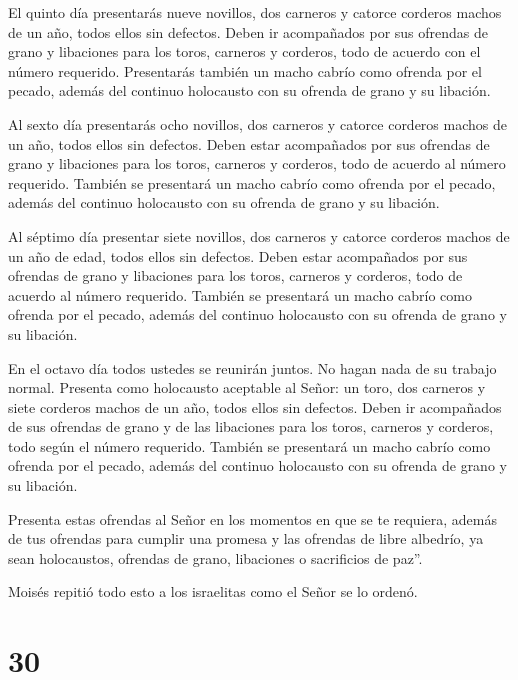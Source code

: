  El quinto día presentarás nueve novillos, dos carneros y
catorce corderos machos de un año, todos ellos sin defectos.
 Deben ir acompañados por sus ofrendas de grano y
libaciones para los toros, carneros y corderos, todo de acuerdo con el
número requerido.  Presentarás también un macho cabrío como
ofrenda por el pecado, además del continuo holocausto con su ofrenda de
grano y su libación.

 Al sexto día presentarás ocho novillos, dos carneros y
catorce corderos machos de un año, todos ellos sin defectos.
 Deben estar acompañados por sus ofrendas de grano y
libaciones para los toros, carneros y corderos, todo de acuerdo al
número requerido.  También se presentará un macho cabrío
como ofrenda por el pecado, además del continuo holocausto con su
ofrenda de grano y su libación.

 Al séptimo día presentar siete novillos, dos carneros y
catorce corderos machos de un año de edad, todos ellos sin defectos.
 Deben estar acompañados por sus ofrendas de grano y
libaciones para los toros, carneros y corderos, todo de acuerdo al
número requerido.  También se presentará un macho cabrío
como ofrenda por el pecado, además del continuo holocausto con su
ofrenda de grano y su libación.

 En el octavo día todos ustedes se reunirán juntos. No
hagan nada de su trabajo normal.  Presenta como holocausto
aceptable al Señor: un toro, dos carneros y siete corderos machos de un
año, todos ellos sin defectos.  Deben ir acompañados de sus
ofrendas de grano y de las libaciones para los toros, carneros y
corderos, todo según el número requerido.  También se
presentará un macho cabrío como ofrenda por el pecado, además del
continuo holocausto con su ofrenda de grano y su libación.

 Presenta estas ofrendas al Señor en los momentos en que se
te requiera, además de tus ofrendas para cumplir una promesa y las
ofrendas de libre albedrío, ya sean holocaustos, ofrendas de grano,
libaciones o sacrificios de paz''.

 Moisés repitió todo esto a los israelitas como el Señor se
lo ordenó.

\hypertarget{section-29}{%
\section{30}\label{section-29}}

